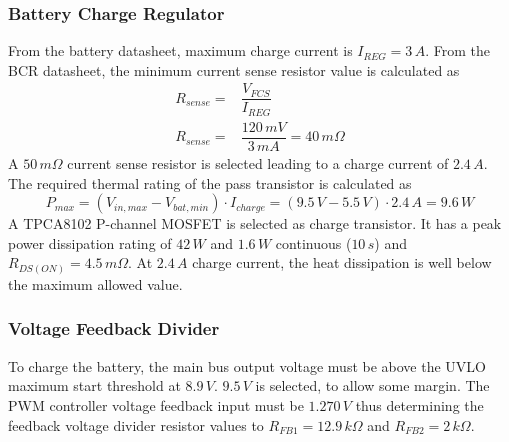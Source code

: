 \subsubsection{Battery Charge Regulator}
%
From the battery datasheet, maximum charge current is $I_{REG}=3\,A$. From the \ac{BCR} datasheet, the minimum current sense resistor value is calculated as
%
\begin{equation}
\begin{split}
R_{sense}=&\dfrac{V_{FCS}}{I_{REG}}\\
R_{sense}=&\dfrac{120\,mV}{3\,mA}=40\,m\Omega
\end{split}
\end{equation}
%
A $50\,m \Omega$ current sense resistor is selected leading to a charge current of $2.4\,A$.
%
The required thermal rating of the pass transistor is calculated as
%
\begin{equation}
P_{max}=(V_{in,max}-V_{bat,min})\cdot I_{charge}=(9.5\,V-5.5\,V)\cdot 2.4\,A=9.6\,W
\end{equation}
%
A TPCA8102 P-channel MOSFET is selected as charge transistor. It has a peak power dissipation rating of $42\,W$ and $1.6\,W$ continuous ($10\,s$) and $R_{DS(ON)}=4.5\,m \Omega$. At $2.4\,A$ charge current, the heat dissipation is well below the maximum allowed value.

\subsubsection*{Voltage Feedback Divider}
To charge the battery, the main bus output voltage must be above the \ac{UVLO} maximum start threshold at $8.9\,V$. $9.5\,V$ is selected, to allow some margin. The \ac{PWM} controller voltage feedback input must be $1.270\,V$ thus determining the feedback voltage divider resistor values to $R_{FB1}=12.9\,k \Omega$ and $R_{FB2}=2\,k \Omega$.
%

